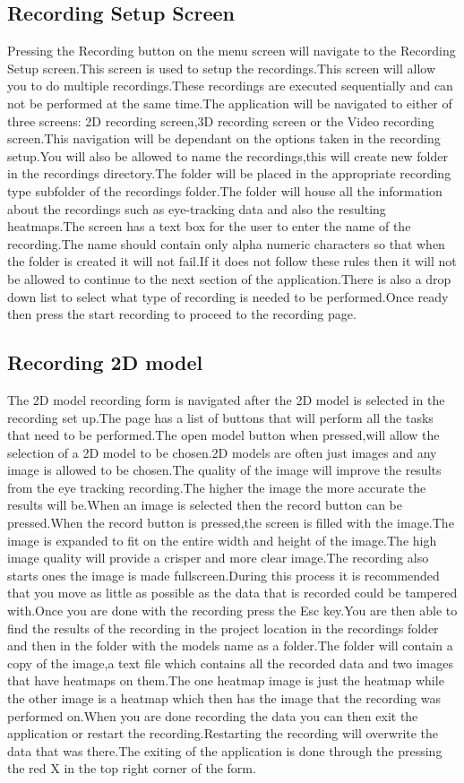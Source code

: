 \subsection{Recording Setup Screen}
Pressing the Recording button on the menu screen will navigate to the Recording Setup screen.This screen is used to setup the recordings.This screen will allow you to do multiple recordings.These recordings are executed sequentially and can not be performed at the same time.The application will be navigated to either of three screens: 2D recording screen,3D recording screen or the Video recording screen.This navigation will be dependant on the options taken in the recording setup.You will also be allowed to name the recordings,this will create new folder in the recordings directory.The folder will be placed in the appropriate recording type subfolder of the recordings folder.The folder will house all the information about the recordings such as eye-tracking data and also the resulting heatmaps.The screen has a text box for the user to enter the name of the recording.The name should contain only alpha numeric characters so that when the folder is created it will not fail.If it does not follow these rules then it will not be allowed to continue to the next section of the application.There is also a drop down list to select what type of recording is needed to be performed.Once ready then press the start recording to proceed to the recording page.
\subsection{Recording 2D model}
The 2D model recording form is navigated after the 2D model is selected in the recording set up.The page has a list of buttons that will perform all the tasks that need to be performed.The open model button when pressed,will allow the selection of a 2D model to be chosen.2D models are often just images and any image is allowed to be chosen.The quality of the image will improve the results from the eye tracking recording.The higher the image the more accurate the results will be.When an image is selected then the record button can be pressed.When the record button is pressed,the screen is filled with the image.The image is expanded to fit on the entire width and height of the image.The high image quality will provide a crisper and more clear image.The recording also starts ones the image is made fullscreen.During this process it is recommended that you move as little as possible as the data that is recorded could be tampered with.Once you are done with the recording press the Esc key.You are then able to find the results of the recording in the project location in the recordings folder and then in the folder with the models name as a folder.The folder will contain a copy of the image,a text file which contains all the recorded data and two images that have heatmaps on them.The one heatmap image is just the heatmap while the other image is a heatmap which then has the image that the recording was performed on.When you are done recording the data you can then exit the application or restart the recording.Restarting the recording will overwrite the data  that was there.The exiting of the application is done through the pressing the red X in the top right corner of the form.
